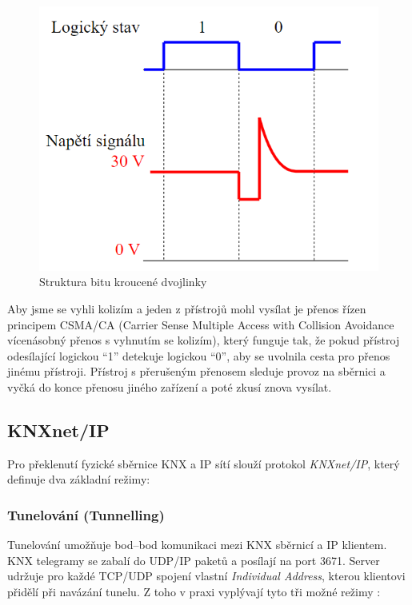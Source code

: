 \begin{figure}[!h]
  \begin{center}
    \includegraphics[scale=0.7]{obrazky/Struktura bitu.png}
  \end{center}
  \caption[Struktura bitu kroucené dvojlinky \cite{Celkovy prehled}]{Struktura bitu kroucené dvojlinky \cite{Celkovy prehled}}
  \label{fig:Struktura bitu kroucené dvojlinky}
\end{figure}

Aby jsme se vyhli kolizím a jeden z přístrojů mohl vysílat je přenos řízen principem CSMA/CA (Carrier Sense Multiple Access with Collision Avoidance vícenásobný přenos s vyhnutím se kolizím), který funguje tak, že pokud přístroj odesílající logickou “1” detekuje logickou “0”, aby se uvolnila cesta pro přenos jinému přístroji. Přístroj s přerušeným přenosem sleduje provoz na sběrnici a vyčká do konce přenosu jiného zařízení a poté zkusí znova vysílat. \cite{Celkovy prehled}
\subsection{KNXnet/IP}

Pro překlenutí fyzické sběrnice KNX a IP sítí slouží protokol \emph{KNXnet/IP}, který definuje dva základní režimy:

\subsubsection{Tunelování (Tunnelling)}  
Tunelování umožňuje bod–bod komunikaci mezi KNX sběrnicí a IP klientem. KNX telegramy se zabalí do UDP/IP paketů a posílají na port 3671. Server udržuje pro každé TCP/UDP spojení vlastní \textit{Individual Address}, kterou klientovi přidělí při navázání tunelu. Z toho v praxi vyplývají tyto tři možné režimy \cite{KNXTunnel}:

